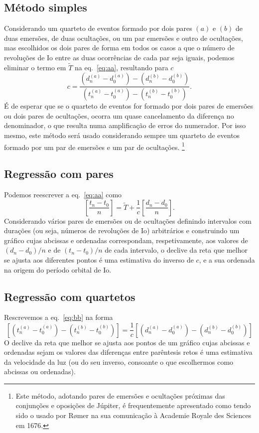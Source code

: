 \documentclass[]{article}
\begin{document}
\subsection{Método simples}
Considerando um quarteto de eventos formado por dois pares $(a)$ e $(b)$ de duas
emersões, de duas oculta\-ções, ou um par emersões e outro de ocultações, mas
escolhidos os dois pares de forma em todos os casos a que o número de revoluções
de Io entre as duas ocorrências de cada par seja iguais, podemos eliminar o
termo em $\tilde T$ na eq.~\eqref{eq:aa}, resultando para $c$
\begin{equation}\label{eq:bb}
  c=\frac%
  {\left(d^{(a)}_n-d^{(a)}_0\right)-\left(d^{(b)}_n-d^{(b)}_0\right)}%
  {\left(t^{(a)}_n-t^{(a)}_0\right)-\left(t^{(b)}_n-t^{(b)}_0\right)}.
\end{equation}
 É de esperar que se o quarteto de eventos for formado por dois pares
de emersões ou dois pares de ocultações, ocorra um quase cancelamento da
diferença no denominador, o que resulta numa amplificação de erros do numerador.
Por isso mesmo, este método será usado considerando sempre um quarteto de
eventos formado por um par de emersões e um par de ocultações.%
\footnote{Este método, adotando pares de emersões e ocultações próximas das
  conjunções e oposições de Júpiter, é frequentemente apresentado como tendo
  sido o usado por R{\o}mer na sua comunicação à Academie Royale des Sciences em
1676.}

\subsection{Regressão com pares}
Podemos reescrever a eq.~\eqref{eq:aa} como
\begin{equation}
  \left[\frac{t_n-t_0}{n}\right]=\tilde T+
  \frac{1}{c}\left[\frac{d_n-d_0}{n}\right].
\end{equation}
Considerando vários pares de emersões ou de ocultações definindo intervalos com
durações (ou seja, números de revoluções de Io) arbitrários e construindo um
gráfico cujas abcissas e ordenadas correspondam, respetivamente, aos valores de
$(d_n-d_0)/n$ e de $(t_n-t_0)/n$ de cada intervalo, o declive da reta que
melhor se ajusta aos diferentes pontos é uma estimativa do inverso de $c$, e a
sua ordenada na origem do período orbital de Io.

\subsection{Regressão com quartetos}
Rescrevemos a eq.~\eqref{eq:bb} na forma
\begin{equation}
  \left[
    {\left(t^{(a)}_n-t^{(a)}_0\right)-\left(t^{(b)}_n-t^{(b)}_0\right)}
  \right]=
  \frac{1}{c}
  \left[
    {\left(d^{(a)}_n-d^{(a)}_0\right)-\left(d^{(b)}_n-d^{(b)}_0\right)}
  \right]
\end{equation}
O declive da reta que melhor se ajusta aos pontos de um gráfico cujas abcissas e
ordenadas sejam os valores das diferenças entre parêntesis retos é uma
estimativa da velocidade da luz (ou do seu inverso, consoante o que escolhermos
como abcissas ou ordenadas).
\end{document}
